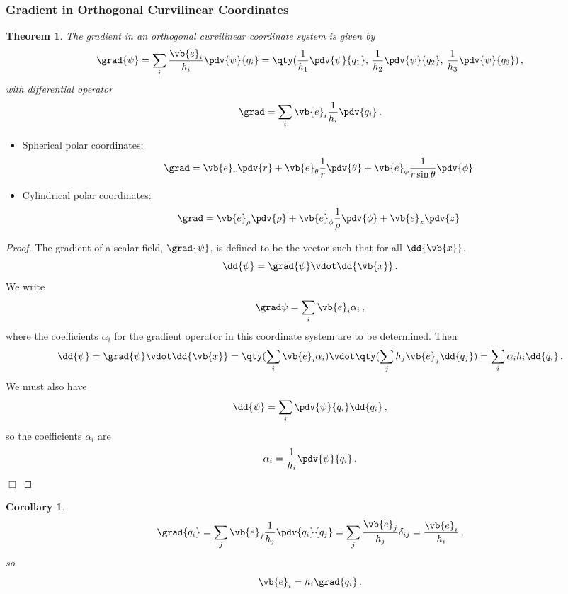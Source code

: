 \documentclass{article}
\theoremstyle{plain}\theoremheaderfont{\normalfont\itshape}\theorembodyfont{\rmfamily}\theoremseparator{.}\newtheorem*{rem}{Remark}\newtheorem*{ex}{Example}\newtheorem*{proof}{Proof}\newtheorem*{altp}{Alternative proof}
\theoremstyle{plain}\theoremheaderfont{\normalfont\bfseries}\theorembodyfont{\rmfamily}\theoremseparator{.}\newtheorem{thm}{Theorem}[section]\newtheorem{lem}[thm]{Lemma}\newtheorem{prop}[thm]{Proposition}\newtheorem*{cor}{Corollary}\newtheorem{defn}[thm]{Definition}\newtheorem{clm}[thm]{Claim}\newtheorem{clminproof}{Claim}
\theoremstyle{break}\theoremheaderfont{\normalfont\itshape}\theorembodyfont{\rmfamily}\theoremseparator{.\medskip}\newtheorem*{proofskip}{Proof}\newtheorem*{exs}{Examples}\newtheorem*{rems}{Remarks}
\theoremstyle{break}\theoremheaderfont{\normalfont\bfseries}\theorembodyfont{\rmfamily}\theoremseparator{.\medskip}\newtheorem{lemskip}[thm]{Lemma}\newtheorem{defnskip}[thm]{Definition}\newtheorem{propskip}[thm]{Proposition}\newtheorem{thmskip}[thm]{Theorem}
\numberwithin{equation}{section}
\newcommand{\qed}{\hfill\ensuremath{\Box}}
\begin{document}
	\subsubsection{Gradient in Orthogonal Curvilinear Coordinates}
	\begin{thm}
		The gradient in an orthogonal curvilinear coordinate system is given by
		\[\grad{\psi}=\sum_{i}\frac{\vb{e}_i}{h_i}\pdv{\psi}{q_i}=\qty(\frac{1}{h_1}\pdv{\psi}{q_1},\, \frac{1}{h_2}\pdv{\psi}{q_2},\, \frac{1}{h_3}\pdv{\psi}{q_3})\,,\]
		with differential operator
		\[\grad=\sum_{i}\vb{e}_i\frac{1}{h_i}\pdv{q_i}\,.\]
	\end{thm}
	\begin{itemize}
		\item Spherical polar coordinates:
		\[\grad=\vb{e}_r\pdv{r}+\vb{e}_\theta\frac{1}{r}\pdv{\theta}+\vb{e}_\phi\frac{1}{r\sin\theta}\pdv{\phi}\]
		\item Cylindrical polar coordinates:
		\[\grad=\vb{e}_\rho\pdv{\rho}+\vb{e}_\phi\frac{1}{\rho}\pdv{\phi}+\vb{e}_z\pdv{z}\]
	\end{itemize}
	\begin{proof}
		The gradient of a scalar field, \(\grad{\psi}\), is defined to be the vector such that for all \(\dd{\vb{x}}\),
		\[\dd{\psi}=\grad{\psi}\vdot\dd{\vb{x}}\,.\]
		We write
		\[\grad\psi=\sum_i \vb{e}_i\alpha_i\,,\]
		where the coefficients \(\alpha_i\) for the gradient operator in this coordinate system are to be determined. Then
		\[\dd{\psi}=\grad{\psi}\vdot\dd{\vb{x}}=\qty(\sum_{i}\vb{e}_i\alpha_i)\vdot\qty(\sum_{j}h_j\vb{e}_j\dd{q_j})=\sum_i\alpha_i h_i\dd{q_i}\,.\]
		We must also have
		\[\dd{\psi}=\sum_{i}\pdv{\psi}{q_i}\dd{q_i}\,,\]
		so the coefficients \(\alpha_i\) are
		\[\alpha_i=\frac{1}{h_i}\pdv{\psi}{q_i}\,.\]\qed
	\end{proof}
	\begin{cor}
		\[\grad{q_i}=\sum_{j}\vb{e}_j\frac{1}{h_j}\pdv{q_i}{q_j}=\sum_{j}\frac{\vb{e}_j}{h_j}\delta_{ij}=\frac{\vb{e}_i}{h_i}\,,\]
		so
		\[\vb{e}_i=h_i\grad{q_i}\,.\]
	\end{cor}
\end{document}

